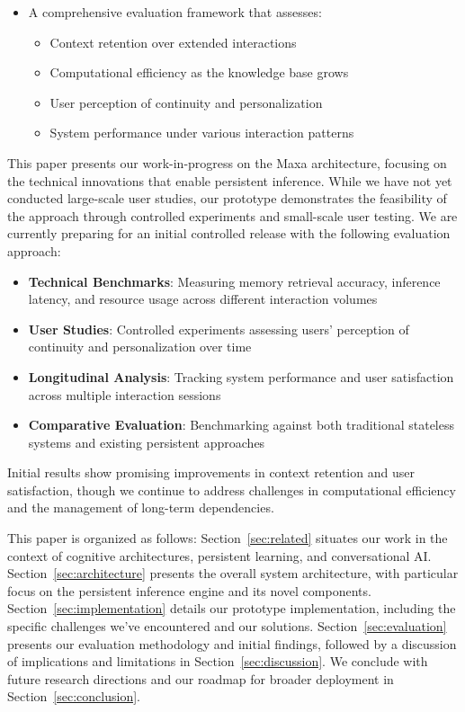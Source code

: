 \begin{itemize}
    \item A comprehensive evaluation framework that assesses:
    \begin{itemize}
        \item Context retention over extended interactions
        \item Computational efficiency as the knowledge base grows
        \item User perception of continuity and personalization
        \item System performance under various interaction patterns
    \end{itemize}
\end{itemize}

This paper presents our work-in-progress on the Maxa architecture, focusing on the technical innovations that enable persistent inference. While we have not yet conducted large-scale user studies, our prototype demonstrates the feasibility of the approach through controlled experiments and small-scale user testing. We are currently preparing for an initial controlled release with the following evaluation approach:

\begin{itemize}
    \item \textbf{Technical Benchmarks}: Measuring memory retrieval accuracy, inference latency, and resource usage across different interaction volumes
    \item \textbf{User Studies}: Controlled experiments assessing users' perception of continuity and personalization over time
    \item \textbf{Longitudinal Analysis}: Tracking system performance and user satisfaction across multiple interaction sessions
    \item \textbf{Comparative Evaluation}: Benchmarking against both traditional stateless systems and existing persistent approaches
\end{itemize}

Initial results show promising improvements in context retention and user satisfaction, though we continue to address challenges in computational efficiency and the management of long-term dependencies.

This paper is organized as follows: Section~\ref{sec:related} situates our work in the context of cognitive architectures, persistent learning, and conversational AI. Section~\ref{sec:architecture} presents the overall system architecture, with particular focus on the persistent inference engine and its novel components. Section~\ref{sec:implementation} details our prototype implementation, including the specific challenges we've encountered and our solutions. Section~\ref{sec:evaluation} presents our evaluation methodology and initial findings, followed by a discussion of implications and limitations in Section~\ref{sec:discussion}. We conclude with future research directions and our roadmap for broader deployment in Section~\ref{sec:conclusion}.
